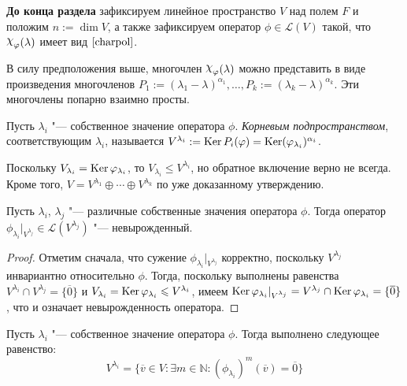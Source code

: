 \textbf{До конца раздела} зафиксируем линейное пространство $V$ над полем $F$ и положим $n := \dim{V}$, а также зафиксируем оператор $\phi \in \mathcal L(V)$ такой, что  $\Chi_\phi(\lambda)$ имеет вид $\eqref*{charpol}$.

\begin{note}
	В силу предположения выше, многочлен $\Chi_\phi(\lambda)$ можно представить в виде произведения многочленов $P_1 := (\lambda_1 - \lambda)^{\alpha_1}, \dotsc, P_k := (\lambda_k - \lambda)^{\alpha_k}$. Эти многочлены попарно взаимно просты.
\end{note}

\begin{definition}
	Пусть $\lambda_i$ "--- собственное значение оператора $\phi$. \textit{Корневым подпространством}, соответствующим $\lambda_i$, называется $V^{\lambda_i} := \ke{P_i(\phi)} \hm{=} \ke(\phi_{\lambda_i})^{\alpha_i}$.
\end{definition}

\begin{note}
	Поскольку $V_{\lambda_i} = \operatorname{Ker}{\varphi_{\lambda_i}}$, то $V_{\lambda_i} \le V^{\lambda_i}$, но обратное включение верно не всегда. Кроме того, $V = V^{\lambda_1} \oplus \dotsb \oplus V^{\lambda_k}$ по уже доказанному утверждению.
\end{note}

\begin{proposition}
	Пусть $\lambda_i$, $\lambda_j$ "--- различные собственные значения оператора $\phi$. Тогда оператор $\phi_{\lambda_i}|_{V^{\lambda_j}} \in \mathcal{L}(V^{\lambda_j})$ "--- невырожденный.
\end{proposition}

\begin{proof}
	Отметим сначала, что сужение $\phi_{\lambda_i}|_{V^{\lambda_j}}$ корректно, поскольку $V^{\lambda_j}$ инвариантно относительно $\phi$. Тогда, поскольку выполнены равенства $V^{\lambda_i} \cap V^{\lambda_j} = \{\overline{0}\}$ и $V_{\lambda_i} = \operatorname{Ker}{\varphi_{\lambda_i}} \leqslant V^{\lambda_i}$, имеем $\ke{\phi_{\lambda_i}|_{V^{\lambda_j}}} = V^{\lambda_j} \cap \ke{\phi_{\lambda_i}} \hm{=} \{\overline{0}\}$, что и означает невырожденность оператора.
\end{proof}

\begin{proposition}
	Пусть $\lambda_i$ "--- собственное значение оператора $\phi$. Тогда выполнено следующее равенство:
	\[V^{\lambda_i} = \{\overline{v} \in V: \exists m \in \mathbb{N}: (\phi_{\lambda_i})^m(\overline{v}) = \overline{0}\}\]
\end{proposition}

